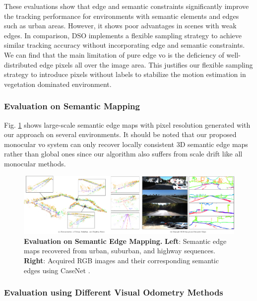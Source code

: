 These evaluations show that edge and semantic constraints significantly improve the tracking performance for environments with semantic elements and edges such as urban areas. 
However, it shows poor advantages in scenes with weak edges. 
In comparison, DSO implements a flexible sampling strategy to achieve similar
tracking accuracy without incorporating edge and semantic constraints. 
We can find that the main limitation of pure edge \acrshort{vo} is the deficiency of
well-distributed edge pixels all over the image area. 
This justifies our flexible sampling strategy to introduce pixels without labels to stabilize the motion estimation in vegetation dominated environment.

\subsubsection{Evaluation on Semantic Mapping} 

Fig. \ref{fig:semantics_reconstruction} shows large-scale semantic edge maps with pixel resolution generated with our approach on several environments.  
It should be noted that our proposed monocular \acrshort{vo} system can only recover locally consistent 3D semantic edge maps rather than global ones since our algorithm also suffers from scale drift like all monocular methods.  

\begin{figure}
  	\centering
  	\includegraphics[width=\linewidth]{figures/illumination/semantics_reconstruction.pdf}
  	\caption[Evaluation on Semantic Edge Mapping]{ \textbf{Evaluation on Semantic Edge Mapping.} \textbf{Left}: Semantic edge maps recovered from urban, suburban, and highway sequences. \textbf{Right}: Acquired RGB images and their corresponding semantic edges using CaseNet \cite{yu2017casenet}.
  	\label{fig:semantics_reconstruction}}
\end{figure}

\subsubsection{Evaluation using Different Visual Odometry Methods} 

